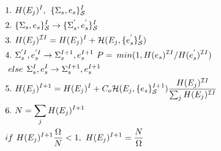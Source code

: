 \documentclass[aps,prl,reprint,superscriptaddress,showkeys]{revtex4-1}
\begin{document}
\begin{equation}
\begin{split}
&1.\hspace{0.125cm} H(E_j)^I ,\hspace{0.15cm}  \{\Sigma_{s},e_s\}_{\mathcal{S}}^I\\
&2. \hspace{0.125cm}\{\Sigma_{s},e_s\}_{\mathcal{S}}^I \rightarrow  \{\Sigma_{s}^{'},e_s^{'}\}_{\mathcal{S}}^I\\
&3. \hspace{0.125cm}H(E_j)^{\mathcal{I}I} = H(E_j)^I + \mathcal{H}(E_j, \{e_{s}^{'}\}_{\mathcal{S}}^I) \\
&4. \hspace{0.125cm} \Sigma_{s}^{'I}, e_s^{'I} \rightarrow \Sigma_{s}^{I+1},e_s^{I+1}   \hspace{0.125cm} P = \hspace{0.075cm} min (1, H(e_s)^{\mathcal{I}I}/H(e_s^{'})^{\mathcal{I}I})\\
& \hspace{0.125cm}else  \hspace{0.15cm} \Sigma_{s}^I, e_s^I \rightarrow \Sigma_{s}^{I+1}, e_s^{I+1}\\
&5. \hspace{0.125cm} H(E_j)^{I+1} = H(E_j)^{I} + C_o\mathcal{H}(E_j, \{e_s\}_{\mathcal{S}}^{I+1})\frac{H(E_j)^{\mathcal{I}I}}{\sum_j H(E_j)^{\mathcal{I}I} }\\
&6. \hspace{0.125cm} N = \sum_j H(E_j)^{I+1} \hspace{0.125cm}\\
& if \hspace{0.125cm} H(E_j)^{I+1}\frac{\Omega}{N}  < 1, \hspace{0.125cm}  H(E_j)^{I+1} =  \frac{N}{\Omega}
\end{split}
\end{equation}
\end{document}

